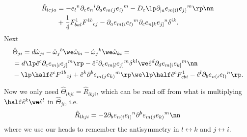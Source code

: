 \begin{align}
\hat R_{lcja} &= -e{_{l}}^n\partial_{c}e{_n}^i\partial_a e_{m(j}e{_{i)}}^m  
- D_{c}\lp\partial_{|a} e_{m|(l}e{_{j)}}^m\rp\nn\\
& + \frac{1}{4}F^1_{bal}F{^{1b}}_{cj}
- \partial_a e_{m(i}e{_{l)}}^m\partial_{c} e_{n[k} e{_{j]}}^n\delta^{ik}. 
\end{align}
%
Next
\begin{align}
&\hat\Theta_{ji} = d\hat\omega_{ji} - \hat\omega{_j}^b\we\hat\omega_{bi} - \hat\omega{_j}^k\we\hat\omega_{ki}=\nonumber\\
& = d\lp\hat e^c\partial_ce_{m[i}e{_{j]}}^m\rp
 - \hat e^c\partial_ce_{m[l}e{_{j]}}^m\delta^{kl}\we\hat e^d\partial_de_{m[i}e{_{k]}}^m\nn\\ 
& - \lp\half\hat e^cF{^{1b}}_{cj} + \hat e^k\partial^b e_{m(j}e{_{k)}}^m\rp\we\lp \half \hat e^cF^1_{cbi} - \hat e^l\partial_b e_{n(i}e{_{l)}}^n\rp.
\end{align}


Now we only need $\hat\Theta_{lkji}=\hat R_{lkji}$, which can be read off from what is multiplying $\half\hat e^k\we\hat e^l$ in $\hat\Theta_{ji}$, i.e.
\begin{align}
\hat R_{lkji} &= -2\partial_{b} e_{n(i}e{_{l)}}^n\partial^b e_{m(j}e{_{k)}}^m\nn\\
\end{align}
where we use our heads to remember the antisymmetry in $l\leftrightarrow k$ and $j\leftrightarrow i$. 

